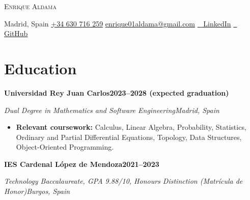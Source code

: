 \documentclass[10pt,letterpaper]{article}
\newenvironment{cvblock}{%
  \begin{list}{}{%
    \setlength{\leftmargin}{10.8pt}%
    \setlength{\rightmargin}{5.4pt}%
    \setlength{\topsep}{0pt}%
    \setlength{\partopsep}{0pt}%
    \setlength{\parsep}{0pt}%
    \setlength{\itemsep}{0pt}%
  }\item[]%
}{\end{list}}
\newcommand{\cventry}[4]{%
  {\fontsize{11}{13}\selectfont\textbf{#1}\hfill\textbf{#2}\par}%
  \textit{#3}\hfill\textit{#4}\par
}
\newenvironment{cvbullets}{%
  \begin{itemize}[leftmargin=24pt,label=\textbullet,
    labelsep=5pt,itemsep=1pt,topsep=1pt,parsep=0pt,partopsep=0pt]%
}{\end{itemize}}
\newcommand{\cvspace}{\vspace{2pt}}
\begin{document}
\begin{center}
  {\fontsize{25}{29}\selectfont\scshape Enrique Aldama}\par
  \vspace{4pt}
  Madrid, Spain\enspace\textbar\enspace
  \href{tel:+34630716259}{+34 630 716 259}\enspace\textbar\enspace
  \href{mailto:enrique01aldama@gmail.com}{\underline{enrique01aldama@gmail.com}}\enspace\textbar\enspace
  \href{https://www.linkedin.com/in/enrique-aldama-moradillo/}{\textcolor{gray}{\faLinkedin\ } LinkedIn}\enspace\textbar\enspace
  \href{https://github.com/EnriqueAldama}{\textcolor{gray}{\faGithub\ } GitHub}
\end{center}
\vspace{-7pt}

\section{Education}
\begin{cvblock}
  \cventry{Universidad Rey Juan Carlos}{2023--2028 (expected graduation)}
    {Dual Degree in Mathematics and Software Engineering}{Madrid, Spain}
  \begin{cvbullets}
    \item \textbf{Relevant coursework:} Calculus, Linear Algebra, Probability, Statistics, Ordinary and Partial Differential Equations, Topology, Data Structures, Object-Oriented Programming.
  \end{cvbullets}
  \cvspace
  \cventry{IES Cardenal López de Mendoza}{2021--2023}
    {Technology Baccalaureate, GPA 9.88/10, Honours Distinction (\textit{Matrícula de Honor})}{Burgos, Spain}
\end{cvblock}
\end{document}

